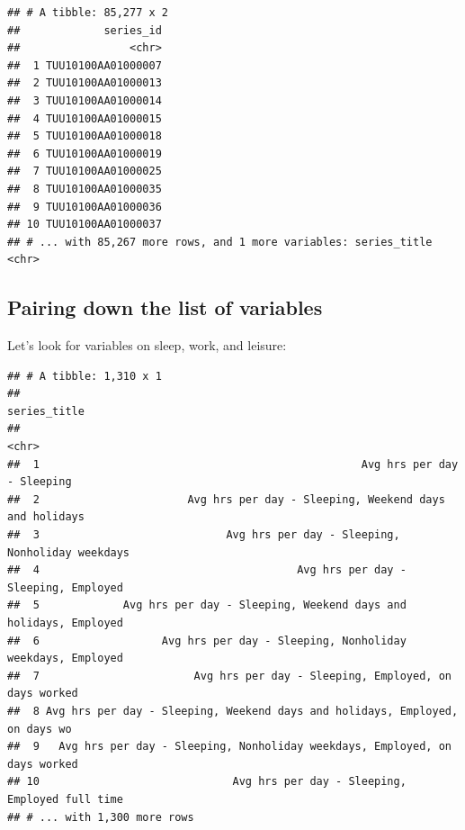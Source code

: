 \documentclass[]{book}
\newenvironment{Shaded}{\begin{snugshade}}{\end{snugshade}}
\newcommand{\KeywordTok}[1]{\textcolor[rgb]{0.13,0.29,0.53}{\textbf{{#1}}}}
\newcommand{\DataTypeTok}[1]{\textcolor[rgb]{0.13,0.29,0.53}{{#1}}}
\newcommand{\StringTok}[1]{\textcolor[rgb]{0.31,0.60,0.02}{{#1}}}
\newcommand{\OtherTok}[1]{\textcolor[rgb]{0.56,0.35,0.01}{{#1}}}
\newcommand{\NormalTok}[1]{{#1}}
\theoremstyle{definition}
\theoremstyle{definition}
\theoremstyle{remark}
\begin{document}
\begin{verbatim}
## # A tibble: 85,277 x 2
##             series_id
##                 <chr>
##  1 TUU10100AA01000007
##  2 TUU10100AA01000013
##  3 TUU10100AA01000014
##  4 TUU10100AA01000015
##  5 TUU10100AA01000018
##  6 TUU10100AA01000019
##  7 TUU10100AA01000025
##  8 TUU10100AA01000035
##  9 TUU10100AA01000036
## 10 TUU10100AA01000037
## # ... with 85,267 more rows, and 1 more variables: series_title <chr>
\end{verbatim}

\subsection{Pairing down the list of
variables}\label{pairing-down-the-list-of-variables}

Let's look for variables on sleep, work, and leisure:

\begin{Shaded}
\end{Shaded}

\begin{verbatim}
## # A tibble: 1,310 x 1
##                                                                   series_title
##                                                                          <chr>
##  1                                                  Avg hrs per day - Sleeping
##  2                       Avg hrs per day - Sleeping, Weekend days and holidays
##  3                             Avg hrs per day - Sleeping, Nonholiday weekdays
##  4                                        Avg hrs per day - Sleeping, Employed
##  5             Avg hrs per day - Sleeping, Weekend days and holidays, Employed
##  6                   Avg hrs per day - Sleeping, Nonholiday weekdays, Employed
##  7                        Avg hrs per day - Sleeping, Employed, on days worked
##  8 Avg hrs per day - Sleeping, Weekend days and holidays, Employed, on days wo
##  9   Avg hrs per day - Sleeping, Nonholiday weekdays, Employed, on days worked
## 10                              Avg hrs per day - Sleeping, Employed full time
## # ... with 1,300 more rows
\end{verbatim}
\end{document}
